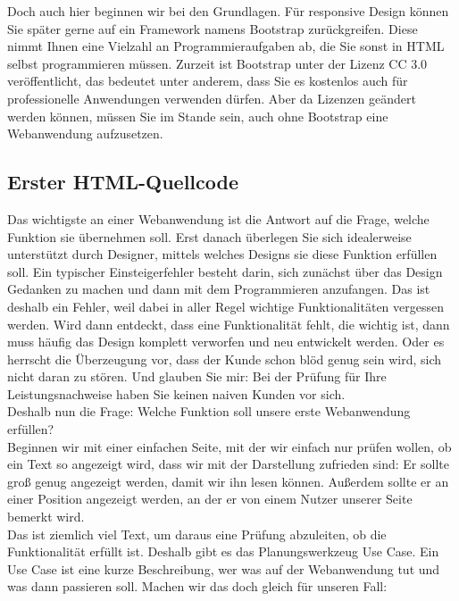 Doch auch hier beginnen wir bei den Grundlagen. Für responsive Design können Sie später gerne auf ein Framework namens Bootstrap zurückgreifen. Diese nimmt Ihnen eine Vielzahl an Programmieraufgaben ab, die Sie sonst in HTML selbst programmieren müssen. Zurzeit ist Bootstrap unter der Lizenz CC 3.0 veröffentlicht, das bedeutet unter anderem, dass Sie es kostenlos auch für professionelle Anwendungen verwenden dürfen. Aber da Lizenzen geändert werden können, müssen Sie im Stande sein, auch ohne Bootstrap eine Webanwendung aufzusetzen.\\

\subsection{Erster HTML-Quellcode}

Das wichtigste an einer Webanwendung ist die Antwort auf die Frage, welche Funktion sie übernehmen soll. Erst danach überlegen Sie sich idealerweise unterstützt durch Designer, mittels welches Designs sie diese Funktion erfüllen soll. Ein typischer Einsteigerfehler besteht darin, sich zunächst über das Design Gedanken zu machen und dann mit dem Programmieren anzufangen. Das ist deshalb ein Fehler, weil dabei in aller Regel wichtige Funktionalitäten vergessen werden. Wird dann entdeckt, dass eine Funktionalität fehlt, die wichtig ist, dann muss häufig das Design komplett verworfen und neu entwickelt werden. Oder es herrscht die Überzeugung vor, dass der Kunde schon blöd genug sein wird, sich nicht daran zu stören. Und glauben Sie mir: Bei der Prüfung für Ihre Leistungsnachweise  haben Sie keinen naiven Kunden vor sich.\\

Deshalb nun die Frage: Welche Funktion soll unsere erste Webanwendung erfüllen?\\

Beginnen wir mit einer einfachen Seite, mit der wir einfach nur prüfen wollen, ob ein Text so angezeigt wird, dass wir mit der Darstellung zufrieden sind: Er sollte groß genug angezeigt werden, damit wir ihn lesen können. Außerdem sollte er an einer Position angezeigt werden, an der er von einem Nutzer unserer Seite bemerkt wird.\\

Das ist ziemlich viel Text, um daraus eine Prüfung abzuleiten, ob die Funktionalität erfüllt ist. Deshalb gibt es das Planungswerkzeug Use Case. Ein Use Case ist eine kurze Beschreibung, wer was auf der Webanwendung tut und was dann passieren soll. Machen wir das doch gleich für unseren Fall:\\

